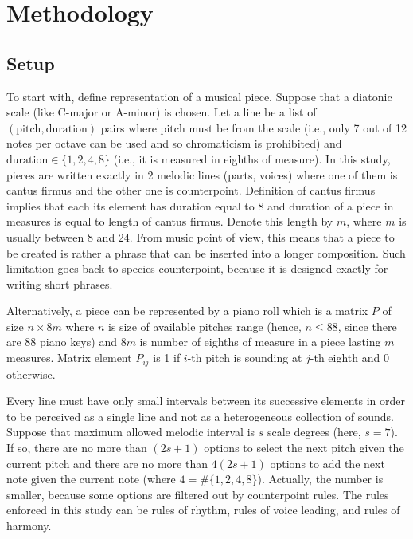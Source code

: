 \documentclass{article}
\begin{document}
\section{Methodology}
\label{sec:methodology}

\subsection{Setup}
\label{subsec:setup}

To start with, define representation of a musical piece. Suppose that a diatonic scale (like C-major or A-minor) is chosen. Let a line be a list of $(\mathrm{pitch}, \mathrm{duration})$ pairs where $\mathrm{pitch}$ must be from the scale (i.e., only 7 out of 12 notes per octave can be used and so chromaticism is prohibited) and $\mathrm{duration} \in \{1, 2, 4, 8\}$ (i.e., it is measured in eighths of measure). In this study, pieces are written exactly in 2 melodic lines (parts, voices) where one of them is cantus firmus and the other one is counterpoint. Definition of cantus firmus implies that each its element has duration equal to 8 and duration of a piece in measures is equal to length of cantus firmus. Denote this length by $m$, where $m$ is usually between 8 and 24. From music point of view, this means that a piece to be created is rather a phrase that can be inserted into a longer composition. Such limitation goes back to species counterpoint, because it is designed exactly for writing short phrases.

Alternatively, a piece can be represented by a piano roll which is a matrix $P$ of size $n \times 8m$ where $n$ is size of available pitches range (hence, $n \le 88$, since there are 88 piano keys) and $8m$ is number of eighths of measure in a piece lasting $m$ measures. Matrix element $P_{ij}$ is 1 if $i$-th pitch is sounding at $j$-th eighth and 0 otherwise.

Every line must have only small intervals between its successive elements in order to be perceived as a single line and not as a heterogeneous collection of sounds. Suppose that maximum allowed melodic interval is $s$ scale degrees (here, $s = 7$). If so, there are no more than $(2s + 1)$ options to select the next pitch given the current pitch and there are no more than $4(2s + 1)$ options to add the next note given the current note (where $4 = \#\{1, 2, 4, 8\}$). Actually, the number is smaller, because some options are filtered out by counterpoint rules. The rules enforced in this study can be rules of rhythm, rules of voice leading, and rules of harmony.
\end{document}
